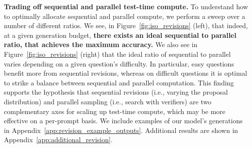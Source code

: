 \textbf{Trading off sequential and parallel test-time compute.} To understand how to optimally allocate sequential and parallel compute, we perform a sweep over a number of different ratios. We see, in Figure~\ref{fig:iso_revisions} (left), that indeed, at a given generation budget, \textbf{there exists an ideal sequential to parallel ratio, that achieves the maximum accuracy.} We also see in Figure~\ref{fig:iso_revisions} (right) that {the ideal ratio of sequential to parallel varies depending on a given question's difficulty.} In particular, easy questions benefit more from sequential revisions, whereas on difficult questions it is optimal to strike a balance between sequential and parallel computation. This finding supports the hypothesis that sequential revisions (i.e., varying the proposal distribution) and parallel sampling (i.e., search with verifiers) are two complementary axes for scaling up test-time compute, which may be more effective on a per-prompt basis. We include examples of our model's generations in Appendix~\ref{app:revision_example_outputs}. Additional results are shown in Appendix~\ref{app:additional_revision}.

